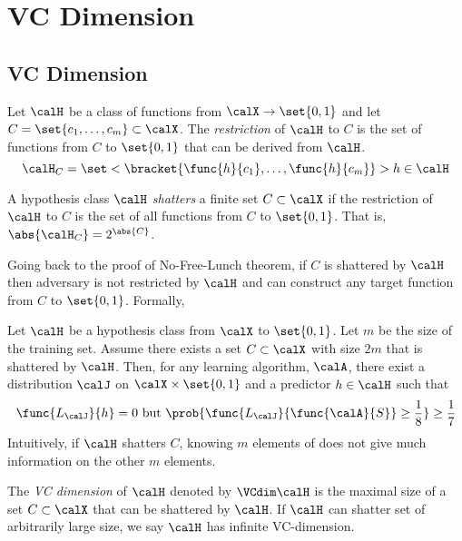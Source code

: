 \chapter{VC Dimension}
\section{VC Dimension}
\begin{definition}
    Let \(\calH\) be a class of functions from \(\calX \to \set{0,1}\) and let \(C = \set{c_1, \dots ,c_m} \subset \calX\). The \textit{restriction} of \(\calH\) to \(C\) is the set of functions from \(C\) to \(\set{0,1}\) that can be derived from \(\calH\).
    \begin{equation*}
        \calH_C = \set<\bracket{\func{h}{c_1} , \dots , \func{h}{c_m}}>{h \in \calH}
    \end{equation*}
\end{definition}

\begin{definition}
    A hypothesis class \(\calH\) \textit{shatters} a finite set \(C \subset \calX\) if the restriction of \(\calH\) to \(C\) is the set of all functions from \(C\) to \(\set{0,1}\). That is, \(\abs{\calH_C} = 2^{\abs{C}}\).
\end{definition}

Going back to the proof of No-Free-Lunch theorem, if \(C\) is shattered by \(\calH\) then adversary is not restricted by \(\calH\) and can construct any target function from \(C\) to \(\set{0,1}\). Formally,

\begin{corollary}
    Let \(\calH\) be a hypothesis class from \(\calX\) to \(\set{0,1}\). Let \(m\) be the size of the training set. Assume there exists a set \(C \subset \calX\) with size \(2m\) that is shattered by \(\calH\). Then, for any learning algorithm, \(\calA\), there exist a distribution \(\calJ\) on \(\calX \times \set{0,1}\) and a predictor \(h \in \calH\) such that 
    \begin{equation*}
        \func{L_{\calJ}}{h} = 0 \ \text{but} \ \prob{\func{L_{\calJ}}{\func{\calA}{S}} \geq \dfrac{1}{8}} \geq \dfrac{1}{7}
    \end{equation*}
    Intuitively, if \(\calH\) shatters \(C\), knowing \(m\) elements of does not give much information on the other \(m\) elements. 
\end{corollary}

\begin{definition}
    The \textit{VC dimension} of \(\calH\) denoted by \(\VCdim \calH\) is the maximal size of a set \(C \subset \calX\) that can be shattered by \(\calH\). If \(\calH\) can shatter set of arbitrarily large size, we say \(\calH\) has infinite VC-dimension. 
\end{definition}

